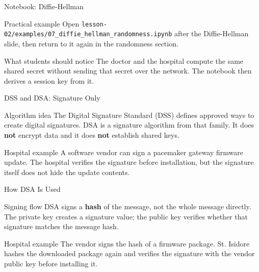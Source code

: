 \documentclass[presentation]{beamer}
\begin{document}
\begin{frame}[c]{Notebook: Diffie-Hellman}
\begin{block}{Practical example}
Open \texttt{lesson-02/examples/07\_diffie\_hellman\_randomness.ipynb} after the Diffie-Hellman
slide, then return to it again in the randomness section.
\end{block}

\begin{exampleblock}{What students should notice}
The doctor and the hospital compute the same shared secret without sending that secret over the
network. The notebook then derives a session key from it.
\end{exampleblock}
\end{frame}

\begin{frame}[c]{DSS and DSA: Signature Only}
\begin{block}{Algorithm idea}
The Digital Signature Standard (DSS) defines approved ways to create digital signatures. DSA is a
signature algorithm from that family. It does \textbf{not} encrypt data and it does \textbf{not}
establish shared keys.
\end{block}

\begin{exampleblock}{Hospital example}
A software vendor can sign a pacemaker gateway firmware update. The hospital verifies the signature
before installation, but the signature itself does not hide the update contents.
\end{exampleblock}
\end{frame}

\begin{frame}[c]{How DSA Is Used}
\begin{block}{Signing flow}
DSA signs a \textbf{hash} of the message, not the whole message directly. The private key creates a
signature value; the public key verifies whether that signature matches the message hash.
\end{block}

\begin{exampleblock}{Hospital example}
The vendor signs the hash of a firmware package. St. Isidore hashes the downloaded package again
and verifies the signature with the vendor public key before installing it.
\end{exampleblock}
\end{frame}
\end{document}
